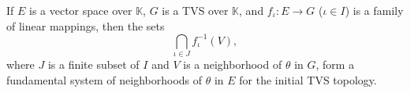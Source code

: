 If $E$ is a vector space over $\mathbb{K}$, $G$ is a TVS over $\mathbb{K}$, and $f_\iota: E \to G$ ($\iota \in I$) is a family of linear mappings, then the sets
$$\bigcap_{\iota \in J} f_\iota^{-1}(V),$$
where $J$ is a finite subset of $I$ and $V$ is a neighborhood of $\theta$ in $G$, form a fundamental system of neighborhoods of $\theta$ in $E$ for the initial TVS topology.
